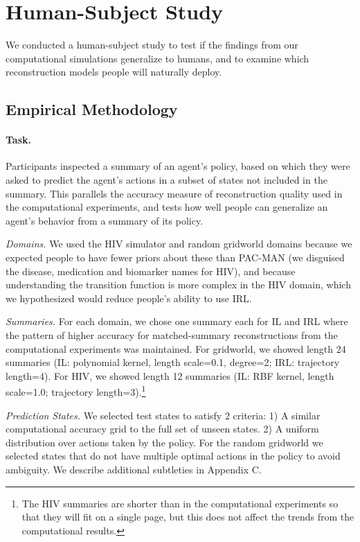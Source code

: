\documentclass{article}
\begin{document}
\section{Human-Subject Study}

We conducted a human-subject study to test if the findings from our computational simulations generalize to humans, and to examine which reconstruction models people will naturally deploy.

\subsection{Empirical Methodology}

\paragraph{Task.} Participants inspected a summary of an agent's policy, based on which they were asked to predict the agent's actions in a subset of states not included in the summary. This parallels the accuracy measure of reconstruction quality used in the computational experiments, and tests how well people can generalize an agent's behavior from a summary of its policy.

\textit{Domains.} We used the HIV simulator and random gridworld domains because we expected people to have fewer priors about these than PAC-MAN (we disguised the disease, medication and biomarker names for HIV), and because understanding the transition function is more complex in the HIV domain, which we hypothesized would reduce people's ability to use IRL.

\textit{Summaries.} For each domain, we chose one summary each for IL and IRL where the pattern of higher accuracy for matched-summary reconstructions from the computational experiments was maintained. For gridworld, we showed length 24 summaries (IL: polynomial kernel, length scale=0.1, degree=2; IRL: trajectory length=4). For HIV, we showed length 12 summaries (IL: RBF kernel, length scale=1.0; trajectory length=3).\footnote{The HIV summaries are shorter than in the computational experiments so that they will fit on a single page, but this does not affect the trends from the computational results.}

\textit{Prediction States.} We selected test states to satisfy 2 criteria: 1) A similar computational accuracy grid to the full set of unseen states. 2) A uniform distribution over actions taken by the policy. For the random gridworld we selected states that do not have multiple optimal actions in the policy to avoid ambiguity. We describe additional subtleties in \cite{lage2019policysummarization} Appendix C.
 
\end{document}
